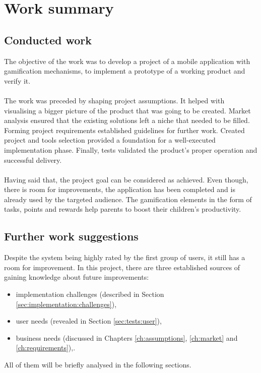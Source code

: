 \chapter{Work summary}\label{ch:summary}

\section{Conducted work}\label{sec:summary:results}



The objective of the work was to develop a project of a mobile application with gamification mechanisms, to implement a prototype of a working product and verify it.
\\\\
The work was preceded by shaping project assumptions. It helped with visualising a bigger picture of the product that was going to be created. Market analysis ensured that the existing solutions left a niche that needed to be filled. Forming project requirements established guidelines for further work. Created project and tools selection provided a foundation for a well-executed implementation phase. Finally, tests validated the product's proper operation and successful delivery.
\\\\
Having said that, the project goal can be considered as achieved. Even though, there is room for improvements, the application has been completed and is already used by the targeted audience. The gamification elements in the form of tasks, points and rewards help parents to boost their children's productivity.

\section{Further work suggestions}\label{sec:summary:furhter}
Despite the system being highly rated by the first group of users, it still has a room for improvement. In this project, there are three established sources of gaining knowledge about future improvements:
\begin{itemize}
    \item implementation challenges (described in Section \ref{sec:implementation:challenges}),
    \item user needs (revealed in Section \ref{sec:tests:user}),
    \item business needs (discussed in Chapters \ref{ch:assumptions}, \ref{ch:market} and \ref{ch:requirements}),.
\end{itemize}
All of them will be briefly analysed in the following sections.



